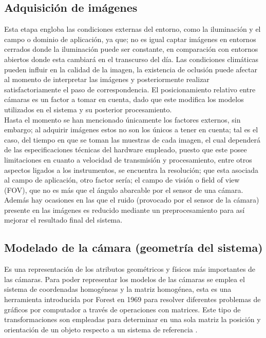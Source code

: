 \subsection{Adquisición de imágenes}
Esta etapa engloba las condiciones externas del entorno, como la iluminación y el campo o dominio de aplicación, ya que; no es igual captar imágenes en entornos cerrados donde la iluminación puede ser constante, en comparación con entornos abiertos donde esta cambiará en el transcurso del día. Las condiciones climáticas pueden influir en la calidad de la imagen, la existencia de oclusión puede afectar al momento de interpretar las imágenes y posteriormente realizar satisfactoriamente el paso de correspondencia. El posicionamiento relativo entre cámaras es un factor a tomar en cuenta, dado que este modifica los modelos utilizados en el sistema y su posterior procesamiento.
\\
Hasta el momento se han mencionado únicamente los factores externos, sin embargo; al adquirir imágenes estos no son los únicos a tener en cuenta; tal es el caso, del tiempo en que se toman las muestras de cada imagen, el cual dependerá de las especificaciones técnicas del hardware empleado, puesto que este posee limitaciones en cuanto a velocidad de transmisión y procesamiento, entre otros aspectos ligados a los instrumentos, se encuentra la resolución; que esta asociada al campo de aplicación, otro factor sería; el campo de visión o field of view (FOV), que no es más que el ángulo abarcable por el sensor de una cámara. Además hay ocasiones en las que el ruido (provocado por el sensor de la cámara) presente en las imágenes es reducido mediante un preprocesamiento para así mejorar el resultado final del sistema.
\subsection{Modelado de la cámara (geometría del sistema)}
Es una representación de los atributos geométricos y físicos más importantes de las cámaras. Para poder representar los modelos de las cámaras se emplea el sistema de coordenadas homogéneas y la matriz homogénea, esta es una herramienta introducida por Forest en 1969 para resolver diferentes problemas de gráficos por computador a través de operaciones con matrices. Este tipo de transformaciones son empleadas para determinar en una sola matriz la posición y orientación de un objeto respecto a un sistema de referencia \cite{RSSFernando_homogeneusC}.

